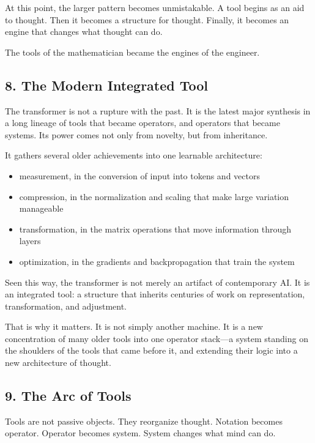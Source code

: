 \documentclass[
]{article}
\providecommand{\tightlist}{%
  \setlength{\itemsep}{0pt}\setlength{\parskip}{0pt}}
\begin{document}
At this point, the larger pattern becomes unmistakable. A tool begins as
an aid to thought. Then it becomes a structure for thought. Finally, it
becomes an engine that changes what thought can do.

The tools of the mathematician became the engines of the engineer.

\hypertarget{the-modern-integrated-tool}{%
\subsection{8. The Modern Integrated
Tool}\label{the-modern-integrated-tool}}

The transformer is not a rupture with the past. It is the latest major
synthesis in a long lineage of tools that became operators, and
operators that became systems. Its power comes not only from novelty,
but from inheritance.

It gathers several older achievements into one learnable architecture:

\begin{itemize}
\tightlist
\item
  measurement, in the conversion of input into tokens and vectors
\item
  compression, in the normalization and scaling that make large
  variation manageable
\item
  transformation, in the matrix operations that move information through
  layers
\item
  optimization, in the gradients and backpropagation that train the
  system
\end{itemize}

Seen this way, the transformer is not merely an artifact of contemporary
AI. It is an integrated tool: a structure that inherits centuries of
work on representation, transformation, and adjustment.

That is why it matters. It is not simply another machine. It is a new
concentration of many older tools into one operator stack---a system
standing on the shoulders of the tools that came before it, and
extending their logic into a new architecture of thought.

\hypertarget{the-arc-of-tools}{%
\subsection{9. The Arc of Tools}\label{the-arc-of-tools}}

Tools are not passive objects. They reorganize thought. Notation becomes
operator. Operator becomes system. System changes what mind can do.
\end{document}
